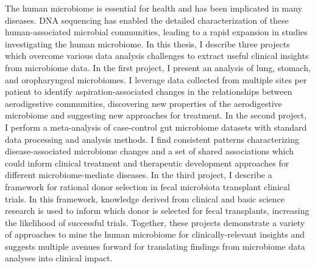 
The human microbiome is essential for health and has been implicated in many diseases.
DNA sequencing has enabled the detailed characterization of these human-associated microbial communities, leading to a rapid expansion in studies investigating the human microbiome.
In this thesis, I describe three projects which overcome various data analysis challenges to extract useful clinical insights from microbiome data.
In the first project, I present an analysis of lung, stomach, and oropharyngeal microbiomes.
I leverage data collected from multiple sites per patient to identify aspiration-associated changes in the relationships between aerodigestive communities, discovering new properties of the aerodigestive microbiome and suggesting new approaches for treatment.
In the second project, I perform a meta-analysis of case-control gut microbiome datasets with standard data processing and analysis methods.
I find consistent patterns characterizing disease-associated microbiome changes and a set of shared associations which could inform clinical treatment and therapeutic development approaches for different microbiome-mediate diseases.
In the third project, I describe a framework for rational donor selection in fecal microbiota transplant clinical trials.
In this framework, knowledge derived from clinical and basic science research is used to inform which donor is selected for fecal transplants, increasing the likelihood of successful trials.
Together, these projects demonstrate a variety of approaches to mine the human microbiome for clinically-relevant insights and suggests multiple avenues forward for translating findings from microbiome data analyses into clinical impact.
